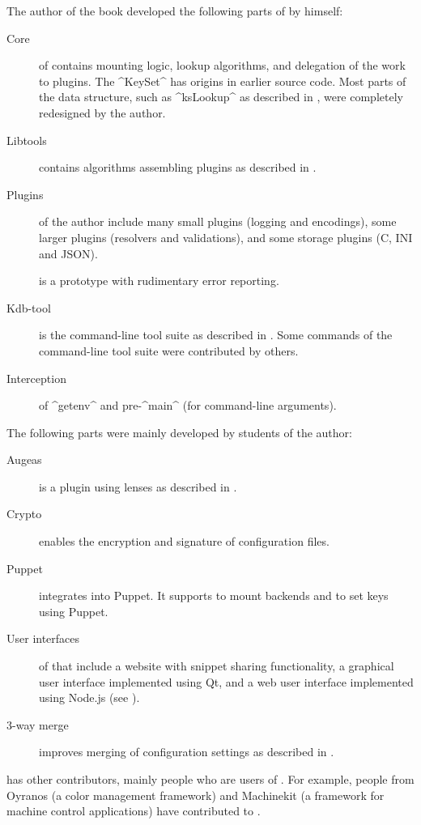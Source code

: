 \begin{code}[language=Cpp,firstnumber=19]
The author of the book developed the following parts of \elektra{} by himself:
\begin{description}
\item[Core] of  contains mounting logic, lookup algorithms, and delegation of the work to plugins.
The ^KeySet^ has origins in earlier source code.
Most parts of the data structure, such as ^ksLookup^ as described in , were completely redesigned by the author.
\item[Libtools] contains algorithms assembling plugins as described in .
\item[Plugins] of the author include many small plugins (logging and encodings), some larger plugins (resolvers and validations), and some storage plugins (C, INI and JSON).
\item[\relax{}] is a prototype with rudimentary error reporting.
\item[Kdb-tool] is the command-line tool suite as described in .
Some commands of the command-line tool suite were contributed by others.
\item[Interception] of ^getenv^ and pre-^main^ (for command-line arguments).
\end{description}



The following parts were mainly developed by students of the author:
\begin{description}
\item[Augeas] is a plugin using lenses as described in .
\item[Crypto] enables the encryption and signature of configuration files.
\item[Puppet] integrates \elektra{} into Puppet.
It supports to mount backends and to set keys using Puppet.
\item[User interfaces] of \elektra{} that include a website with snippet sharing functionality,
a graphical user interface implemented using Qt,
and a web user interface implemented using Node.js (see ).
\item[3-way merge] improves merging of configuration settings as described in .
\end{description}

\elektra{} has other contributors, mainly people who are users of \elektra{}.
For example, people from Oyranos (a color management framework) and Machinekit (a framework for machine control applications) have contributed to \elektra{}.



\end{code}

